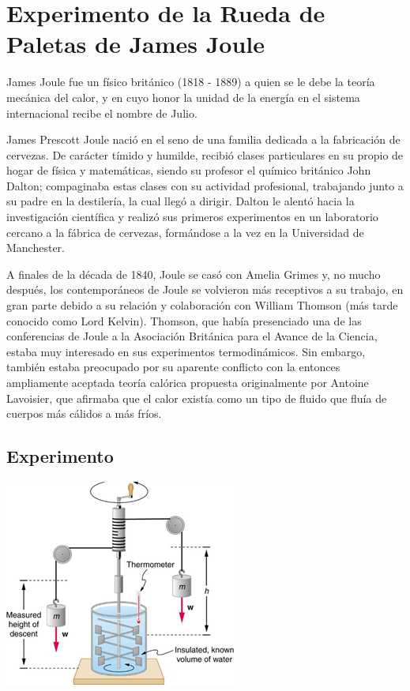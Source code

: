 \documentclass[letterpaper, 10pt, journal]{IEEEtran}
\begin{document}
\section{Experimento de la Rueda de Paletas de James Joule}
James Joule fue un físico británico (1818 - 1889)  a quien se le debe la teoría mecánica del calor, y en cuyo honor la unidad de la energía en el sistema internacional recibe el nombre de Julio.

James Prescott Joule nació en el seno de una familia dedicada a la fabricación de cervezas. De carácter tímido y humilde, recibió clases particulares en su propio de hogar de física y matemáticas, siendo su profesor el químico británico John Dalton; compaginaba estas clases con su actividad profesional, trabajando junto a su padre en la destilería, la cual llegó a dirigir. Dalton le alentó hacia la investigación científica y realizó sus primeros experimentos en un laboratorio cercano a la fábrica de cervezas, formándose a la vez en la Universidad de Manchester.

A finales de la década de 1840, Joule se casó con Amelia Grimes y, no mucho después, los contemporáneos de Joule se volvieron más receptivos a su trabajo, en gran parte debido a su relación y colaboración con William Thomson (más tarde conocido como Lord Kelvin). Thomson, que había presenciado una de las conferencias de Joule a la Asociación Británica para el Avance de la Ciencia, estaba muy interesado en sus experimentos termodinámicos. Sin embargo, también estaba preocupado por su aparente conflicto con la entonces ampliamente aceptada teoría calórica propuesta originalmente por Antoine Lavoisier, que afirmaba que el calor existía como un tipo de fluido que fluía de cuerpos más cálidos a más fríos.

\subsection{Experimento}
\includegraphics[scale=1.5]{paletas}
\end{document}
